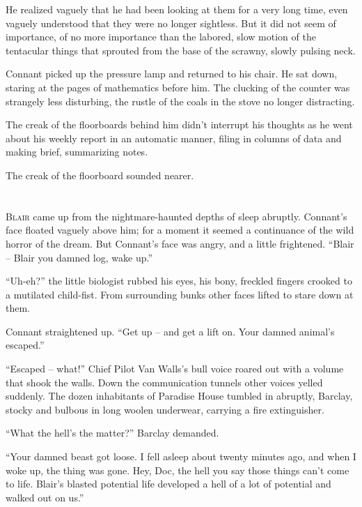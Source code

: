 \documentclass[letterpaper,openany,12pt]{memoir}		%
\begin{document}
He realized vaguely that he had been looking at them for a very long time, even
vaguely understood that they were no longer sightless. But it did not seem of
importance, of no more importance than the labored, slow motion of the
tentacular things that sprouted from the base of the scrawny, slowly pulsing
neck.

Connant picked up the pressure lamp and returned to his chair. He sat down,
staring at the pages of mathematics before him. The clucking of the counter was
strangely less disturbing, the rustle of the coals in the stove no longer
distracting.

The creak of the floorboards behind him didn't interrupt his thoughts as he went
about his weekly report in an automatic manner, filing in columns of data and
making brief, summarizing notes.

The creak of the floorboard sounded nearer.


\chapter[Chapter 5]{}

\lettrine[lines=3,findent=2pt,nindent=2pt]{B}{lair} came up from the
nightmare-haunted depths of sleep abruptly. Connant's face floated vaguely above
him; for a moment it seemed a continuance of the wild horror of the dream. But
Connant's face was angry, and a little frightened. ``Blair -- Blair you damned
log, wake up.''

``Uh-eh?'' the little biologist rubbed his eyes, his bony, freckled fingers
crooked to a mutilated child-fist. From surrounding bunks other faces lifted to
stare down at them.

Connant straightened up. ``Get up -- and get a lift on. Your damned animal's
escaped.''

``Escaped -- what!'' Chief Pilot Van Walls's bull voice roared out with a
volume that shook the walls. Down the communication tunnels other voices yelled
suddenly. The dozen inhabitants of Paradise House tumbled in abruptly, Barclay,
stocky and bulbous in long woolen underwear, carrying a fire extinguisher.

``What the hell's the matter?'' Barclay demanded.

``Your damned beast got loose. I fell asleep about twenty minutes ago, and when
I woke up, the thing was gone. Hey, Doc, the hell you say those things can't
come to life. Blair's blasted potential life developed a hell of a lot of
potential and walked out on us.''
\end{document}
